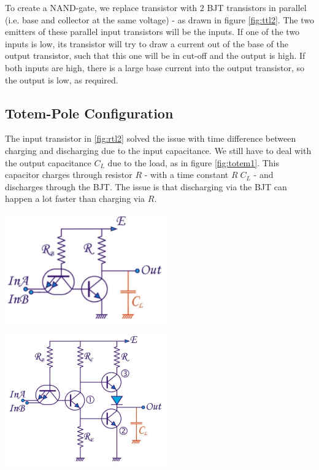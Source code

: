 To create a NAND-gate, we replace transistor  with $2$ BJT transistors in parallel (i.e. base and collector at the same voltage) - as drawn in figure \ref{fig:ttl2}. The two emitters of these parallel input transistors will be the inputs. If one of the two inputs is low, its transistor will try to draw a current out of the base of the output transistor, such that this one will be in cut-off and the output is high. If both inputs are high, there is a large base current into the output transistor, so the output is low, as required.

\subsection{Totem-Pole Configuration}
The input transistor  in \ref{fig:rtl2} solved the issue with time difference between charging and discharging due to the input capacitance. We still have to deal with the output capacitance $C_L$ due to the load, as in figure \ref{fig:totem1}. This capacitor charges through resistor $R$ - with a time constant $R \; C_L$ - and discharges through  the BJT. The issue is that discharging via the BJT can happen a lot faster than charging via $R$.

\begin{minipage}{.5\textwidth}
	\centering
	\includegraphics[width=7cm]{figures/ch15/totem1.jpg}
	\label{fig:totem1}
\end{minipage}%
\begin{minipage}{.5\textwidth}
	\centering
	\includegraphics[width=7cm]{figures/ch15/totem2.jpg}
	\label{fig:totem2}
\end{minipage}

